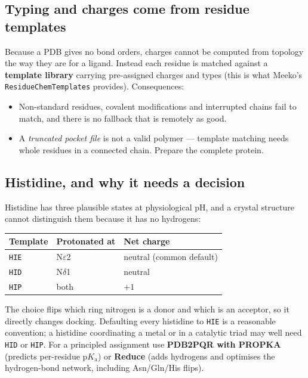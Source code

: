 \documentclass[11pt,a4paper]{article}
\newcommand{\code}[1]{\texttt{#1}}
\begin{document}
\subsection*{Typing and charges come from residue templates}

Because a PDB gives no bond orders, charges cannot be computed from topology the way
they are for a ligand. Instead each residue is matched against a \textbf{template
library} carrying pre-assigned charges and types (this is what Meeko's
\code{ResidueChemTemplates} provides). Consequences:

\begin{itemize}[leftmargin=1.3em, itemsep=2pt]
  \item Non-standard residues, covalent modifications and interrupted chains fail to
        match, and there is no fallback that is remotely as good.
  \item A \emph{truncated pocket file} is not a valid polymer --- template matching
        needs whole residues in a connected chain. Prepare the complete protein.
\end{itemize}

\subsection*{Histidine, and why it needs a decision}

Histidine has three plausible states at physiological pH, and a crystal structure
cannot distinguish them because it has no hydrogens:

\begin{center}
\begin{tabular}{@{}lll@{}}
\toprule
\textbf{Template} & \textbf{Protonated at} & \textbf{Net charge} \\
\midrule
\code{HIE} & N$\varepsilon$2 & neutral (common default) \\
\code{HID} & N$\delta$1 & neutral \\
\code{HIP} & both & $+1$ \\
\bottomrule
\end{tabular}
\end{center}

The choice flips which ring nitrogen is a donor and which is an acceptor, so it
directly changes docking. Defaulting every histidine to \code{HIE} is a reasonable
convention; a histidine coordinating a metal or in a catalytic triad may well need
\code{HID} or \code{HIP}. For a principled assignment use \textbf{PDB2PQR with
PROPKA} (predicts per-residue p$K_\text{a}$) or \textbf{Reduce} (adds hydrogens and
optimises the hydrogen-bond network, including Asn/Gln/His flips).
\end{document}
